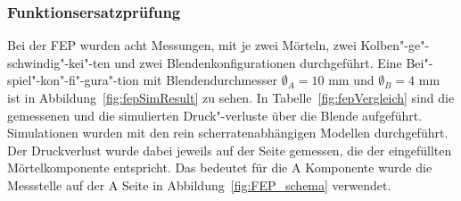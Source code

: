 \subsubsection{Funktionsersatzprüfung}
Bei der FEP wurden acht Messungen, mit je zwei Mörteln, zwei Kolben"-ge"-schwindig"-kei"-ten und zwei Blendenkonfigurationen durchgeführt. 
Eine Bei"-spiel"-kon"-fi"-gura"-tion mit Blendendurchmesser $\emptyset_A=10$ mm und $\emptyset_B=4$ mm ist in Abbildung~\ref{fig:fepSimResult} zu sehen.
In Tabelle~\ref{fig:fepVergleich} sind die gemessenen und die simulierten Druck"-verluste über die Blende aufgeführt. Simulationen wurden mit den rein scherratenabhängigen Modellen durchgeführt. 
Der Druckverlust wurde dabei jeweils auf der Seite gemessen, die der eingefüllten Mörtelkomponente entspricht.
Das bedeutet für die A Komponente wurde die Messstelle auf der A Seite in Abbildung~\ref{fig:FEP_schema} verwendet.
%
